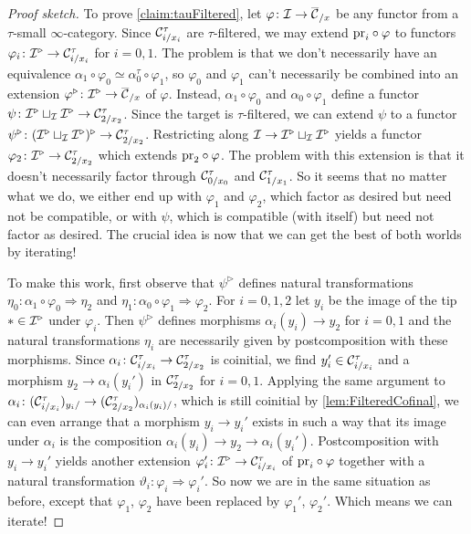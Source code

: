 \begin{proof}[Proof sketch]
	To prove \cref{claim:tauFiltered}, let $\varphi\colon \Ii\rightarrow \ov\Cc_{/x}$ be any functor from a $\tau$-small $\infty$-category. Since $\mathcal{C}_{i/x_i}^\tau$ are $\tau$-filtered, we may extend ${\operatorname{pr}_i}\circ\varphi$ to functors $\varphi_i\colon \mathcal{I}^\triangleright \rightarrow \mathcal{C}_{i/x_i}^\tau$ for $i=0,1$. The problem is that we don't necessarily have an equivalence $\alpha_1\circ\varphi_0\simeq \alpha_0^\tau\circ \varphi_1$, so $\varphi_0$ and $\varphi_1$ can't necessarily be combined into an extension $\varphi^\triangleright\colon \Ii^\triangleright \rightarrow \ov\Cc_{/x}$ of $\varphi$. Instead, $\alpha_1\circ\varphi_0$ and $\alpha_0\circ \varphi_1$ define a functor $\psi\colon \mathcal{I}^\triangleright\sqcup_{\mathcal{I}}\mathcal{I}^\triangleright\rightarrow \mathcal{C}_{2/x_2}^\tau$. Since the target is $\tau$-filtered, we can extend $\psi$ to a functor $\psi^\triangleright\colon (\mathcal{I}^\triangleright\sqcup_{\mathcal{I}}\mathcal{I}^\triangleright)^\triangleright\rightarrow \mathcal{C}_{2/x_2}^\tau$. Restricting along $\mathcal{I}\rightarrow \mathcal{I}^\triangleright\sqcup_{\mathcal{I}}\mathcal{I}^\triangleright$ yields a functor $\varphi_2\colon \mathcal{I}^\triangleright \rightarrow \mathcal{C}_{2/x_2}^\tau$ which extends ${\operatorname{pr}_2}\circ\varphi$. The problem with this extension is that it doesn't necessarily factor through $\mathcal{C}_{0/x_0}^\tau$ and $\mathcal{C}_{1/x_1}^\tau$. So it seems that no matter what we do, we either end up with $\varphi_1$ and $\varphi_2$, which factor as desired but need not be compatible, or with $\psi$, which is compatible (with itself) but need not factor as desired. The crucial idea is now that we can get the best of both worlds by iterating!
	
	To make this work, first observe that $\psi^\triangleright$ defines natural transformations $\eta_0\colon\alpha_1\circ\varphi_0\Rightarrow \eta_2$ and $\eta_1\colon\alpha_0\circ\varphi_1\Rightarrow \varphi_2$. For $i=0,1,2$ let $y_i$ be the image of the tip $*\in\mathcal{I}^\triangleright$ under $\varphi_i$. Then $\psi^\triangleright$ defines morphisms $\alpha_i(y_i)\rightarrow y_2$ for $i=0,1$ and the natural transformations $\eta_i$ are necessarily given by postcomposition with these morphisms. Since $\alpha_i\colon \mathcal{C}_{i/x_i}^\tau\rightarrow \mathcal{C}_{2/x_2}^\tau$ is coinitial, we find $y_i'\in \mathcal{C}_{i/x_i}^\tau$ and a morphism $y_2\rightarrow \alpha_i(y_i')$ in $\mathcal{C}_{2/x_2}^\tau$ for $i=0,1$. Applying the same argument to $\alpha_i\colon(\mathcal{C}_{i/x_i}^\tau)_{y_i/}\rightarrow (\mathcal{C}_{2/x_2}^\tau)_{\alpha_i(y_i)/}$, which is still coinitial by \cref{lem:FilteredCofinal}, we can even arrange that a morphism $y_i\rightarrow y_i'$ exists in such a way that its image under $\alpha_i$ is the composition $\alpha_i(y_i)\rightarrow y_2\rightarrow \alpha_i(y_i')$. Postcomposition with $y_i\rightarrow y_i'$ yields another extension $\varphi_i'\colon \mathcal{I}^\triangleright\rightarrow \mathcal{C}_{i/x_i}^\tau$ of ${\operatorname{pr}_i}\circ\varphi$ together with a natural transformation $\vartheta_i\colon \varphi_i\Rightarrow \varphi_i'$. So now we are in the same situation as before, except that $\varphi_1$, $\varphi_2$ have been replaced by $\varphi_1'$, $\varphi_2'$. Which means we can iterate!
	

\end{proof}
